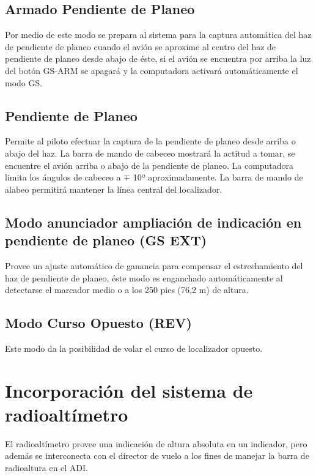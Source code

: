 \subsection{Armado Pendiente de Planeo}
\label{sec:GS.arm}

Por medio de este modo se prepara al sistema para la captura
autom\'atica del haz de pendiente de planeo 
cuando el avi\'on se aproxime al centro del haz de pendiente
de planeo desde abajo de \'este, si el avi\'on se encuentra
por arriba la luz del bot\'on GS-ARM se apagar\'a y la
computadora activar\'a autom\'aticamente el modo GS.

\subsection{Pendiente de Planeo}
\label{sec:gs}

Permite al piloto efectuar la captura de la pendiente de planeo
desde arriba o abajo del haz. La barra de mando de cabeceo mostrar\'a
la actitud a tomar, se encuentre el avi\'on arriba o abajo de la pendiente
de planeo.
La computadora limita los \'angulos de cabeceo a $\mp$ 10º aproximadamente.
La barra de mando de alabeo permitir\'a mantener la l\'inea central del
localizador.

\subsection{Modo anunciador ampliaci\'on de indicaci\'on en pendiente de planeo (GS EXT)}
\label{sec:gs.ext}

Provee un ajuste autom\'atico de ganancia para compensar el estrechamiento
del haz de pendiente de planeo, \'este modo es enganchado
autom\'aticamente al detectarse el marcador medio o a los 250 pies (76,2 m)
de altura.

\subsection{Modo Curso Opuesto (REV)}
\label{sec:rev}

Este modo da la posibilidad de volar el curso de localizador opuesto.

\section{Incorporaci\'on del sistema de radioalt\'imetro}
\label{sec:incorporacion.sistema.radio.altimetro}

El radioalt\'imetro provee una indicaci\'on de altura absoluta en un indicador,
pero adem\'as se interconecta con el director de vuelo a los fines
de manejar la barra de radioaltura en el ADI.

